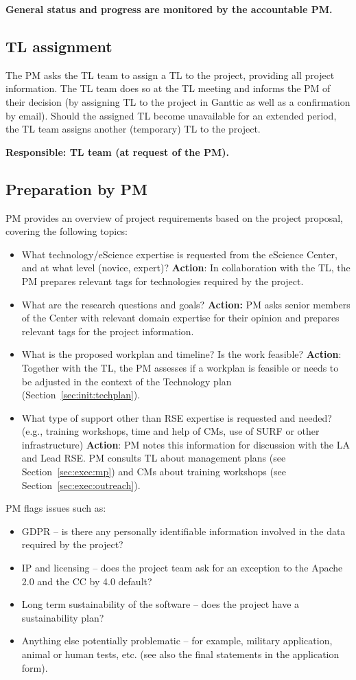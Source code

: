 \textbf{General status and progress are monitored by the accountable PM.}

\subsection{TL assignment}
\label{sec:init:tl-assign}
The PM asks the TL team to assign a TL to the project, providing all project information. The TL team does so at the TL
meeting and informs the PM of their decision (by assigning TL to the project in Ganttic as well as a confirmation by
email). Should the assigned TL become unavailable for an extended period, the TL team assigns another (temporary) TL to
the project.

\textbf{Responsible: TL team (at request of the PM).}

\subsection{Preparation by PM}
PM provides an overview of project requirements based on the project proposal, covering the following topics:

\begin{itemize}
\item What technology/eScience expertise is requested from the eScience Center, and at what level (novice, expert)?
\textbf{Action}: In collaboration with the TL, the PM prepares relevant tags for technologies required by the project.
\item What are the research questions and goals? \textbf{Action:} PM asks senior members of the Center with relevant domain
expertise for their opinion and prepares relevant tags for the project information.
\item What is the proposed workplan and timeline? Is the work feasible? \textbf{Action}: Together with the TL, the PM assesses
if a workplan is feasible or needs to be adjusted in the context of the Technology plan (Section~\ref{sec:init:techplan}).
\item What type of support other than RSE expertise is requested and needed? (e.g., training workshops, time and help of CMs,
use of SURF or other infrastructure) \textbf{Action}: PM notes this information for discussion with the LA and Lead
RSE. PM consults TL about management plans (see Section~\ref{sec:exec:mp}) and CMs about training workshops (see
Section~\ref{sec:exec:outreach}).
\end{itemize}
PM flags issues such as:
\begin{itemize}
\item GDPR – is there any personally identifiable information involved in the data required by the project? 
\item IP and licensing – does the project team ask for an exception to the Apache 2.0 and the CC by 4.0 default? 
\item Long term sustainability of the software – does the project have a sustainability plan? 
\item Anything else potentially problematic – for example, military application, animal or human tests, etc. (see also the
final statements in the application form).
\end{itemize}

